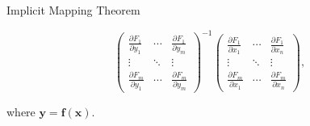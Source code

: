 \documentclass[11pt]{../../TexTemplate/elegantbook}
\begin{document}
\begin{theorem}{Implicit Mapping Theorem}
\begin{enumerate}
\[        \begin{pmatrix}
            \frac{\partial F_1}{\partial y_1} & \cdots & \frac{\partial F_1}{\partial y_m} \\
            \vdots & \ddots & \vdots \\
            \frac{\partial F_m}{\partial y_1} & \cdots & \frac{\partial F_m}{\partial y_m}
        \end{pmatrix}^{-1}
        \begin{pmatrix}
            \frac{\partial F_1}{\partial x_1} & \cdots & \frac{\partial F_1}{\partial x_n} \\
            \vdots & \ddots & \vdots \\
            \frac{\partial F_m}{\partial x_1} & \cdots & \frac{\partial F_m}{\partial x_n}
        \end{pmatrix},
        \]
    \end{enumerate}
    where \( \mathbf{y} = \mathbf{f}(\mathbf{x}) \).
\end{theorem}
\end{document}
